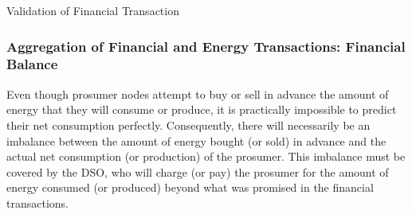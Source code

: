 \documentclass[sigconf]{acmart}
\begin{document}
\begin{algorithm}[h!]
\caption{Validation of Financial Transaction}
\label{alg:validateFinancialTransaction}
\begin{algorithmic}[1]
    \EndIf
    \EndIf
    \EndIf
    \EndIf
  \EndIf
\EndFor
{}
\Else
\EndIf
%
\end{algorithmic}
\end{algorithm}

\subsubsection{Aggregation of Financial and Energy Transactions: Financial Balance}

Even though prosumer nodes attempt to buy or sell in advance the amount of energy that they will consume or produce, it is practically impossible to predict their net consumption perfectly.
Consequently, there will necessarily be an imbalance between the amount of energy bought (or sold) in advance and the actual net consumption (or production) of the prosumer.
This imbalance must be covered by the DSO, who will charge (or pay) the prosumer for the amount of energy consumed (or produced) beyond what was promised in the financial transactions.
\end{document}

